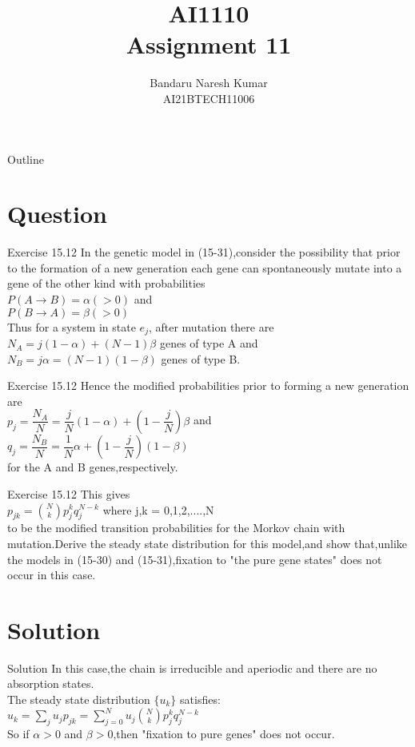 \documentclass{beamer}
\title{AI1110 \\ Assignment 11}
\author{Bandaru Naresh Kumar \\ AI21BTECH11006}
\date{}
\begin{document}
	\begin{frame}
		\titlepage
	\end{frame}
	
	\begin{frame}{Outline}
    		\tableofcontents
	\end{frame}
	
	\section{Question}
	\begin{frame}{Exercise 15.12}
       In the genetic model in (15-31),consider the possibility that prior to the formation of a new generation each gene can spontaneously mutate into a gene of the other kind with probabilities\\
       $P(A\rightarrow B) = \alpha(>0)$ and\\
       $P(B\rightarrow A) = \beta(>0)$\\
       Thus for a system in state $e_j$, after mutation there are $N_A = j(1-\alpha)+(N-1)\beta$ genes of type A and $N_B = j\alpha = (N-1)(1-\beta)$ genes of type B. 
	\end{frame}
	
	\begin{frame}{Exercise 15.12}
	  Hence the modified probabilities prior to forming a new generation are\\
	  $p_j = \dfrac{N_A}{N} = \dfrac{j}{N}(1-\alpha)+(1-\dfrac{j}{N})\beta$ and\\
	  $q_j = \dfrac{N_B}{N} = \dfrac{1}{N}\alpha+(1-\dfrac{j}{N})(1-\beta)$\\
	  for the A and B genes,respectively.	
	\end{frame}
	
	\begin{frame}{Exercise 15.12}
	This gives\\
	$p_{jk} = \binom{N}{k} p_j^k q_j^{N-k}$ where j,k = 0,1,2,....,N\\
	to be the modified transition probabilities for the Morkov chain with mutation.Derive the steady state distribution for this model,and show that,unlike the models in (15-30) and (15-31),fixation to "the pure gene states" does not occur in this case.
	\end{frame}
	
	\section{Solution}
	\begin{frame}{Solution}
	     In this case,the chain is irreducible and aperiodic and there are no absorption states.\\
	     The steady state distribution $\{u_k\}$ satisfies:\\
	     $u_k = \sum_j u_jp_{jk} = \sum_{j=0}^N u_j \binom{N}{k} p_j^kq_j^{N-k}$\\
	     So if $\alpha > 0$ and $\beta > 0$,then "fixation to pure genes" does not occur.    	     
	 \end{frame}
	  
\end{document}
